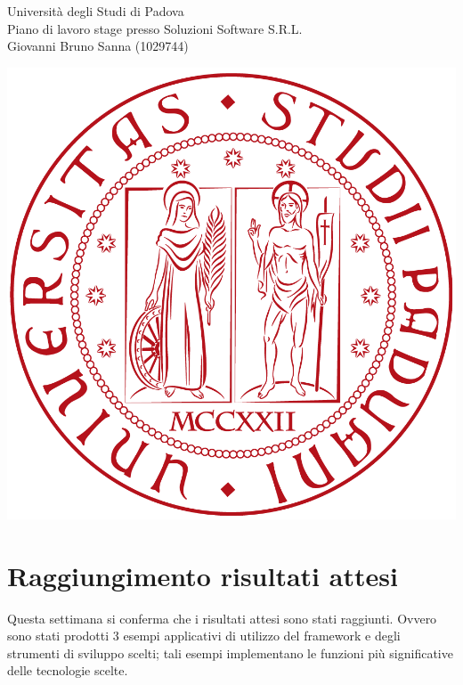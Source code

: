 \documentclass[11pt,notitlepage]{article}
\newcommand{\nomeStudente}{Giovanni Bruno}
\newcommand{\cognomeStudente}{Sanna}
\newcommand{\matricolaStudente}{1029744}
\newcommand{\ragioneSocAzienda}{Soluzioni Software S.R.L.}
\begin{document}
\newpage
\noindent
\parbox{0.7\columnwidth}{Università degli Studi di Padova\\
	Piano di lavoro stage presso \ragioneSocAzienda{}\\
	\nomeStudente{} \cognomeStudente{} (\matricolaStudente{})}%
\parbox{0.3\columnwidth}{
	\hfill \includegraphics[scale=0.08]{immagini/logo-unipd.png}}

\bigskip
\section*{Raggiungimento risultati attesi}
Questa settimana si conferma che i risultati attesi sono stati raggiunti. Ovvero sono stati prodotti 3 esempi applicativi di utilizzo del framework e degli strumenti di sviluppo scelti; tali esempi implementano le funzioni più significative delle tecnologie scelte.
\end{document}
